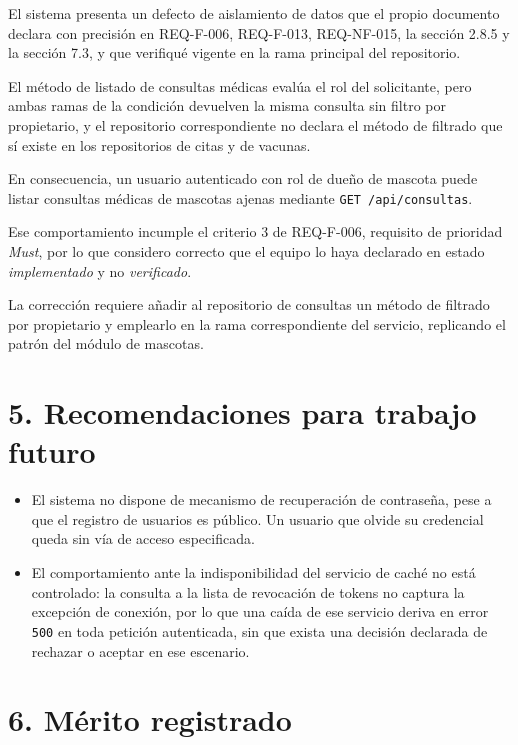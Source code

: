 \documentclass[11pt,letterpaper]{article}
\begin{document}
El sistema presenta un defecto de aislamiento de datos que el propio documento declara con precisión en REQ-F-006, REQ-F-013, REQ-NF-015, la sección 2.8.5 y la sección 7.3, y que verifiqué vigente en la rama principal del repositorio.

El método de listado de consultas médicas evalúa el rol del solicitante, pero ambas ramas de la condición devuelven la misma consulta sin filtro por propietario, y el repositorio correspondiente no declara el método de filtrado que sí existe en los repositorios de citas y de vacunas.

En consecuencia, un usuario autenticado con rol de dueño de mascota puede listar consultas médicas de mascotas ajenas mediante \texttt{GET /api/consultas}.

Ese comportamiento incumple el criterio 3 de REQ-F-006, requisito de prioridad \emph{Must}, por lo que considero correcto que el equipo lo haya declarado en estado \emph{implementado} y no \emph{verificado}.

La corrección requiere añadir al repositorio de consultas un método de filtrado por propietario y emplearlo en la rama correspondiente del servicio, replicando el patrón del módulo de mascotas.

\vspace{-4pt}
\section*{5. Recomendaciones para trabajo futuro}

\begin{itemize}
	\item El sistema no dispone de mecanismo de recuperación de contraseña, pese a que el registro de usuarios es público. Un usuario que olvide su credencial queda sin vía de acceso especificada.
	\item El comportamiento ante la indisponibilidad del servicio de caché no está controlado: la consulta a la lista de revocación de tokens no captura la excepción de conexión, por lo que una caída de ese servicio deriva en error \texttt{500} en toda petición autenticada, sin que exista una decisión declarada de rechazar o aceptar en ese escenario.
\end{itemize}

\vspace{-2pt}
\section*{6. Mérito registrado}
\end{document}
